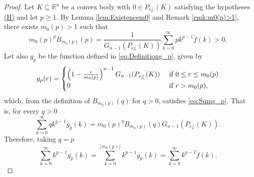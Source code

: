 \documentclass[10pt]{amsart}
\def\R{\mathbb{R}}
\numberwithin{equation}{section}
\begin{document}
\begin{proof}
Let $K\subseteq\R^n$ be a convex body with $0\in P_{e_n^\perp}(K)$  satisfying the hypotheses \hyperlink{(H)}{(H)} and let $p\geq 1$. By Lemma \ref{lem:Existencem0} and Remark \ref{rmk:m0(p)>1}, there exists $m_0(p)>1$ such that
$$
m_0(p)^pB_{m_0(p)}(p)=\frac{1}{G_{n-1}(P_{e_n^\perp}(K))}\sum_{k=0}^\infty pk^{p-1}\tilde{f}(k)>0.
$$
Let also $g_p$  be the function defined in \eqref{eq:Definitiong_p}, given by
$$
g_p(r)=\begin{cases}
\left(1-\frac{r}{m_0(p)}\right)^{n-1}G_{n-1}(P_{e_n^\perp}(K)) &\textrm{ if }0\leq r\leq m_0(p)\cr
0&\textrm{ if }r>m_0(p),\cr
\end{cases}
$$
which, from the definition of $B_{m_0(p)}(q)$ for $q>0$, satisfies \eqref{eq:Sumg_p}. That is, for every $q>0$
$$
\sum_{k=0}^\infty qk^{q-1}g_p(k)=m_0(p)^qB_{m_0(p)}(q)G_{n-1}(P_{e_n^\perp}(K)).
$$
Therefore, taking $q=p$
$$
\sum_{k=0}^{\infty}k^{p-1}g_p(k)=\sum_{k=0}^{\lfloor m_0(p)\rfloor}k^{p-1}g_p(k)=\sum_{k=0}^\infty k^{p-1}\tilde{f}(k).
$$


\end{proof}
\end{document}
